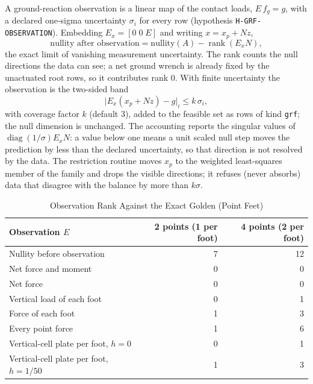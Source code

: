 \documentclass[11pt,a4paper]{article}
\newcommand{\rank}{\operatorname{rank}}
\begin{document}
A ground-reaction observation is a linear map of the contact loads,
$E\,f_g=g$, with a declared one-sigma uncertainty $\sigma_i$ for every row
(hypothesis \texttt{H-GRF-OBSERVATION}).  Embedding $E_x=[0\;0\;E]$ and writing
$x=x_p+Nz$,
\begin{equation}
\text{nullity after observation}=\text{nullity}(A)-\rank(E_xN),
\end{equation}
the exact limit of vanishing measurement uncertainty.  The rank counts the
null directions the data can see; a net ground wrench is already fixed by the
unactuated root rows, so it contributes rank $0$.  With finite uncertainty the
observation is the two-sided band
\begin{equation}
\bigl|E_x(x_p+Nz)-g\bigr|_i\le k\,\sigma_i,
\end{equation}
with coverage factor $k$ (default $3$), added to the feasible set as rows of
kind \texttt{grf}; the null dimension is unchanged.  The accounting reports the
singular values of $\operatorname{diag}(1/\sigma)E_xN$: a value below one means
a unit scaled null step moves the prediction by less than the declared
uncertainty, so that direction is not resolved by the data.  The restriction
routine moves $x_p$ to the weighted least-squares member of the family and
drops the visible directions; it refuses (never absorbs) data that disagree
with the balance by more than $k\sigma$.

\begin{table}[ht]
\centering
\caption{Observation Rank Against the Exact Golden (Point Feet)}
\label{tab:lowerbody}
\small
\begin{tabular}{@{}lrr@{}}
\toprule
Observation $E$ & 2 points (1 per foot) & 4 points (2 per foot) \\
\midrule
Nullity before observation        & 7 & 12 \\
Net force and moment              & 0 & 0 \\
Net force                         & 0 & 0 \\
Vertical load of each foot        & 0 & 1 \\
Force of each foot                & 1 & 3 \\
Every point force                 & 1 & 6 \\
Vertical-cell plate per foot, $h=0$        & 0 & 1 \\
Vertical-cell plate per foot, $h=1/50$     & 1 & 3 \\
\bottomrule
\end{tabular}
\end{table}
\end{document}
